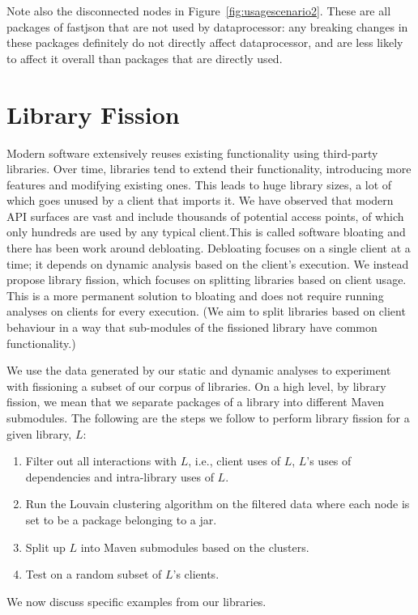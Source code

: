 Note also the disconnected nodes in Figure~\ref{fig:usagescenario2}. These are all packages of fastjson that are not used by dataprocessor: any breaking changes in these packages definitely do not directly affect dataprocessor, and are less likely to affect it overall than packages that are directly used.

\section{Library Fission}
\label{sec:fission}
Modern software extensively reuses existing functionality using third-party libraries. Over time, libraries tend to extend their functionality, introducing more features and modifying existing ones. This leads to huge library sizes, a lot of which goes unused by a client that imports it. We have observed that modern API surfaces are vast and include thousands of potential access points, of which only hundreds are used by any typical client.This is called software bloating and there has been work around debloating. Debloating focuses on a single client at a time; it depends on dynamic analysis based on the client’s execution. We instead propose library fission, which focuses on splitting libraries based on client usage. This is a more permanent solution to bloating and does not require running analyses on clients for every execution. (We aim to split libraries based on client behaviour in a way that sub-modules of the fissioned library have common functionality.) 

We use the data generated by our static and dynamic analyses to experiment with fissioning a subset of our corpus of libraries. On a high level, by library fission, we mean that we separate packages of a library into different Maven submodules. The following are the steps we follow to perform library fission for a given library, $L$:
\begin{enumerate}
\item Filter out all interactions with $L$, i.e., client uses of $L$, $L$'s uses of dependencies and intra-library uses of $L$.
\item Run the Louvain clustering algorithm on the filtered data where each node is set to be a package belonging to a jar.
\item Split up $L$ into Maven submodules based on the clusters.
\item Test on a random subset of $L$'s clients.
\end{enumerate}

We now discuss specific examples from our libraries.

